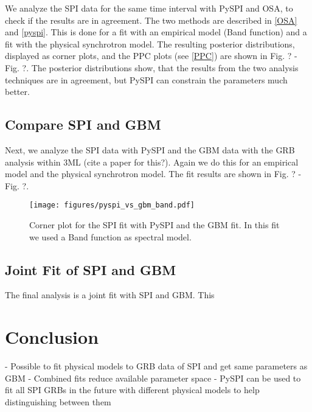 \documentclass[twocolumn]{aa}
\begin{document}
We analyze the SPI data for the same time interval with PySPI and OSA, to check if the results are in agreement. The two methods are described in \ref{OSA} and \ref{pyspi}. This is done for a fit with an empirical model (Band function) and a fit with the physical synchrotron model. The resulting posterior distributions, displayed as corner plots, and the PPC plots (see \ref{PPC}) are shown in Fig. ? - Fig. ?. The posterior distributions show, that the results from the two analysis techniques are in agreement, but PySPI can constrain the parameters much better.



\subsection{Compare SPI and GBM}

Next, we analyze the SPI data with PySPI and the GBM data with the GRB analysis within 3ML (cite a paper for this?). Again we do this for an empirical model and the physical synchrotron model. The fit results are shown in Fig. ? - Fig. ?.

\begin{figure}
  \begin{centering}
    \texttt{[image: figures/pyspi\_vs\_gbm\_band.pdf]}
    \label{fig:corner_gbm_pyspi_band}
    \caption{Corner plot for the SPI fit with PySPI and the GBM fit. In this fit we used a Band function as spectral model.}
  \end{centering}
\end{figure}

\subsection{Joint Fit of SPI and GBM}

The final analysis is a joint fit with SPI and GBM. This

\section{Conclusion}

- Possible to fit physical models to GRB data of SPI and get same parameters as GBM
- Combined fits reduce available parameter space
- PySPI can be used to fit all SPI GRBs in the future with different physical models to help distinguishing between them
\end{document}
